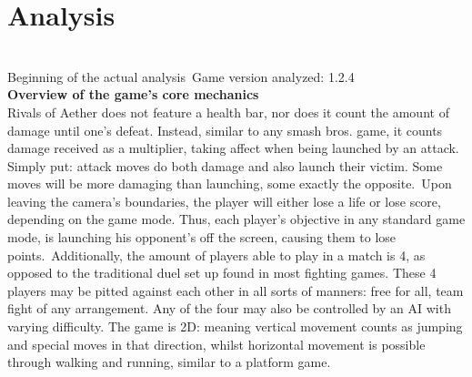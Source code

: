 \documentclass{article}
\begin{document}
\chapter{Analysis}\\
Beginning of the actual analysis\
Game version analyzed: 1.2.4\\%
\textbf{Overview of the game's core mechanics}\\
Rivals of Aether does not feature a health bar, nor does it count the amount of damage until one's defeat. Instead, similar to any smash bros. game, it counts damage received as a multiplier, taking affect when being launched by an attack. Simply put: attack moves do both damage and also launch their victim. Some moves will be more damaging than launching, some exactly the opposite.\
Upon leaving the camera's boundaries, the player will either lose a life or lose score, depending on the game mode. Thus, each player's objective in any standard game mode, is launching his opponent's off the screen, causing them to lose points.\
 Additionally, the amount of players able to play in a match is 4, as opposed to the traditional duel set up found in most fighting games. These 4 players may be pitted against each other in all sorts of manners: free for all, team fight of any arrangement. Any of the four may also be controlled by an AI with varying difficulty. The game is 2D: meaning vertical movement counts as jumping and special moves in that direction, whilst horizontal movement is possible through walking and running, similar to a platform game.\\ %
\end{document}
